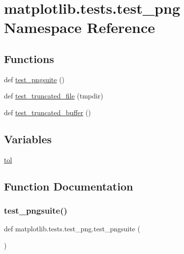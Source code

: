 \hypertarget{namespacematplotlib_1_1tests_1_1test__png}{}\section{matplotlib.\+tests.\+test\+\_\+png Namespace Reference}
\label{namespacematplotlib_1_1tests_1_1test__png}
\subsection*{Functions}
\begin{DoxyCompactItemize}
\item 
def \hyperlink{namespacematplotlib_1_1tests_1_1test__png_abbf494dc176649e6ea1b812cbe75f867}{test\+\_\+pngsuite} ()
\item 
def \hyperlink{namespacematplotlib_1_1tests_1_1test__png_a6e60574df600dfe589587233ecd37429}{test\+\_\+truncated\+\_\+file} (tmpdir)
\item 
def \hyperlink{namespacematplotlib_1_1tests_1_1test__png_a0548ffdde59898fda3663220bc069da2}{test\+\_\+truncated\+\_\+buffer} ()
\end{DoxyCompactItemize}
\subsection*{Variables}
\begin{DoxyCompactItemize}
\item 
\hyperlink{namespacematplotlib_1_1tests_1_1test__png_a6840b504df260750ae6b4e619066623f}{tol}
\end{DoxyCompactItemize}


\subsection{Function Documentation}
\mbox{\label{namespacematplotlib_1_1tests_1_1test__png_abbf494dc176649e6ea1b812cbe75f867}} 
\subsubsection{\texorpdfstring{test\+\_\+pngsuite()}{test\_pngsuite()}}
{\footnotesize\ttfamily def matplotlib.\+tests.\+test\+\_\+png.\+test\+\_\+pngsuite (\begin{DoxyParamCaption}{ }\end{DoxyParamCaption})}

